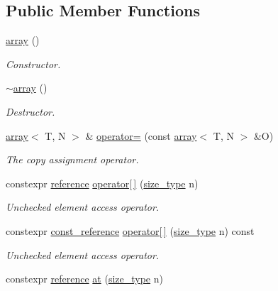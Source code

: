 \subsection*{Public Member Functions}
\begin{DoxyCompactItemize}
\item 
\hyperlink{classshad_1_1array_a9ccd30dfaecc3e5a052c4b29dc7d853a}{array} ()
\begin{DoxyCompactList}\small\item\em Constructor. \end{DoxyCompactList}\item 
\hyperlink{classshad_1_1array_a4d03dfb7bd7470adb567f1e22b2365d3}{$\sim$array} ()
\begin{DoxyCompactList}\small\item\em Destructor. \end{DoxyCompactList}\item 
\hyperlink{classshad_1_1array}{array}$<$ T, N $>$ \& \hyperlink{classshad_1_1array_a224af2493437951bb9ff514ef4acae4e}{operator=} (const \hyperlink{classshad_1_1array}{array}$<$ T, N $>$ \&O)
\begin{DoxyCompactList}\small\item\em The copy assignment operator. \end{DoxyCompactList}\item 
constexpr \hyperlink{group__Types_gad3f7e8f8130d2cfb3b554c72f9f29c57}{reference} \hyperlink{group__Element_gaedde045849710fdb88ff7aa46f7b83bb}{operator\mbox{[}$\,$\mbox{]}} (\hyperlink{group__Types_ga037c76c91958f47f53bfebad4d67f8bb}{size\-\_\-type} n)
\begin{DoxyCompactList}\small\item\em Unchecked element access operator. \end{DoxyCompactList}\item 
constexpr \hyperlink{group__Types_gaac06273bdbb48ad582528e12e76bd859}{const\-\_\-reference} \hyperlink{group__Element_gac3910c3068e053991d5276a49c88450b}{operator\mbox{[}$\,$\mbox{]}} (\hyperlink{group__Types_ga037c76c91958f47f53bfebad4d67f8bb}{size\-\_\-type} n) const 
\begin{DoxyCompactList}\small\item\em Unchecked element access operator. \end{DoxyCompactList}\item 
constexpr \hyperlink{group__Types_gad3f7e8f8130d2cfb3b554c72f9f29c57}{reference} \hyperlink{group__Element_gaf19fa246a5be092c19a70931728f01af}{at} (\hyperlink{group__Types_ga037c76c91958f47f53bfebad4d67f8bb}{size\-\_\-type} n)

\end{DoxyCompactItemize}
